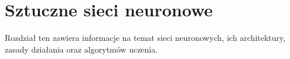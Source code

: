 \chapter{Sztuczne sieci neuronowe}
\label{cha:sztuczne_sieci_neuronowe}

Rozdział ten zawiera informacje na temat sieci neuronowych, ich architektury, zasady działania oraz algorytmów uczenia.



